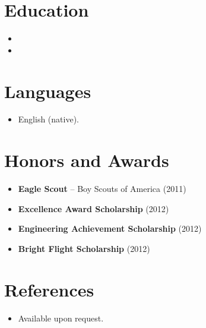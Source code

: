 \documentclass[11pt,a4paper,sans]{moderncv}
\begin{document}
\section{Education}
\vspace{1pt}
\begin{itemize}

\item{}

\vspace{3pt}

\item{}

\end{itemize}


\section{Languages}
\vspace{1pt}
\begin{itemize}
\item English (native).
\end{itemize}


\section{Honors and Awards}
\vspace{1pt}
\begin{itemize}
\item{\textbf{Eagle Scout} -- Boy Scouts of America (2011)}
\item{\textbf{Excellence Award Scholarship} (2012)}
\item{\textbf{Engineering Achievement Scholarship} (2012)}
\item{\textbf{Bright Flight Scholarship} (2012)}
\end{itemize}


\section{References}
\vspace{1pt}
\begin{itemize}
\item{Available upon request.}
\end{itemize}
\end{document}
